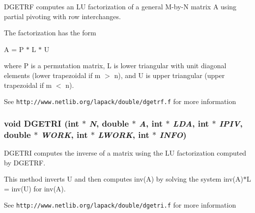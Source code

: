 DGETRF computes an LU factorization of a general M-by-N matrix A using partial pivoting with row interchanges.

The factorization has the form

A = P $\ast$ L $\ast$ U

where P is a permutation matrix, L is lower triangular with unit diagonal elements (lower trapezoidal if m $>$ n), and U is upper triangular (upper trapezoidal if m $<$ n).

See {\tt http://www.netlib.org/lapack/double/dgetrf.f} for more information 
\subsubsection{\setlength{\rightskip}{0pt plus 5cm}void DGETRI (int $\ast$ {\em N}, double $\ast$ {\em A}, int $\ast$ {\em LDA}, int $\ast$ {\em IPIV}, double $\ast$ {\em WORK}, int $\ast$ {\em LWORK}, int $\ast$ {\em INFO})}\label{lapack_8h_686bb1e5551a7024ddf3e5fc766e96b8_686bb1e5551a7024ddf3e5fc766e96b8}


DGETRI computes the inverse of a matrix using the LU factorization computed by DGETRF.

This method inverts U and then computes inv(A) by solving the system inv(A)$\ast$L = inv(U) for inv(A).

See {\tt http://www.netlib.org/lapack/double/dgetri.f} for more information 